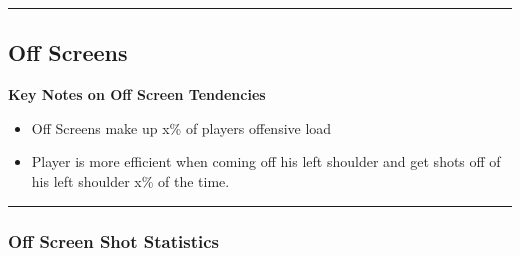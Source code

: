\documentclass[a4paper,12pt]{article}
\begin{document}
\vspace{-1em} %
\hrule height 1pt width 1\textwidth %
\vspace{1em} %
\clearpage











\subsection{Off Screens}
\vspace{1.25em} %
\textbf{Key Notes on Off Screen Tendencies}
\vspace{0.5em} %

\begin{itemize}
    \item Off Screens make up x\% of players offensive load
    \vspace{0.3em} %
    \item Player is more efficient when coming off his left shoulder and get shots off of his left shoulder x\% of the time.
\end{itemize}

\vspace{1em} %
\hrule height 1pt width 1\textwidth %
\vspace{0em} %

\subsubsection{Off Screen Shot Statistics}
\end{document}
